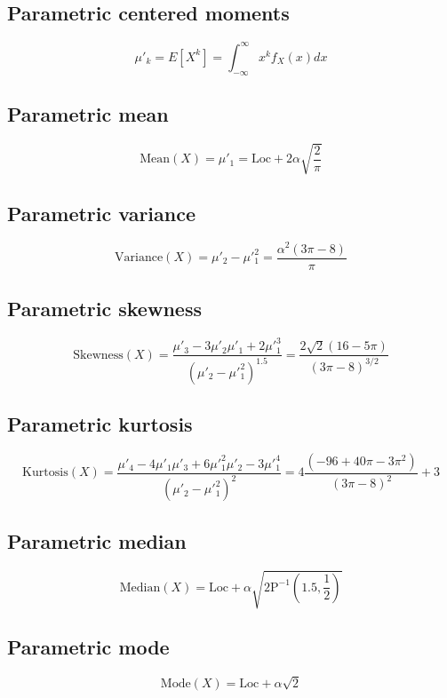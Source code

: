 \documentclass{article}
\begin{document}
\subsection{Parametric centered moments}
\begin{equation*} \mu'_{k}=E[X^k]=\int_{-\infty}^{\infty}x^{k}f_{X}\left(x\right)dx \end{equation*}
\subsection{Parametric mean}
\begin{equation*} \mathrm{Mean}(X)=\mu'_{1}=\text{Loc}+2\alpha \sqrt{\frac{2}{\pi}} \end{equation*}
\subsection{Parametric variance}
\begin{equation*} \mathrm{Variance}(X)=\mu'_{2}-\mu'^{2}_{1}=\frac{\alpha^2(3 \pi-8)}{\pi} \end{equation*}
\subsection{Parametric skewness}
\begin{equation*} \mathrm{Skewness}(X)=\frac{\mu'_{3}-3\mu'_{2}\mu'_{1}+2\mu'^{3}_{1}}{(\mu'_{2}-\mu'^{2}_{1})^{1.5}}=\frac{2 \sqrt{2} (16 -5 \pi)}{(3 \pi-8)^{3/2}} \end{equation*}
\subsection{Parametric kurtosis}
\begin{equation*} \mathrm{Kurtosis}(X)=\frac{\mu'_{4}-4\mu'_{1}\mu'_{3}+6\mu'^{2}_{1}\mu'_{2}-3\mu'^{4}_{1}}{(\mu'_{2}-\mu'^{2}_{1})^{2}}=4\frac{\left(-96+40\pi-3\pi^2\right)}{(3 \pi-8)^2}+3 \end{equation*}
\subsection{Parametric median}
\begin{equation*} \mathrm{Median}(X)=\text{Loc}+\alpha\sqrt{2\text{P}^{-1}\left(1.5,\frac{1}{2}\right)} \end{equation*}
\subsection{Parametric mode}
\begin{equation*} \mathrm{Mode}(X)=\text{Loc}+\alpha\sqrt{2} \end{equation*}
\end{document}
